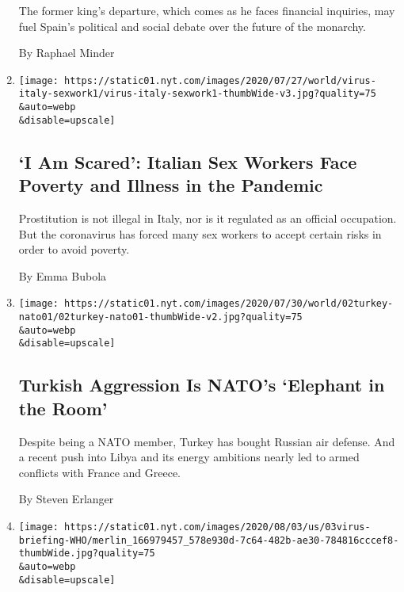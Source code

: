 \begin{enumerate}
  The former king's departure, which comes as he faces financial
  inquiries, may fuel Spain's political and social debate over the
  future of the monarchy.

  By Raphael Minder
\item
  \href{/2020/08/03/world/europe/italy-coronavirus-prostitution-sex-work.html}{}

  \texttt{[image: https://static01.nyt.com/images/2020/07/27/world/virus-italy-sexwork1/virus-italy-sexwork1-thumbWide-v3.jpg?quality=75\\\&auto=webp\\\&disable=upscale]}

  \hypertarget{i-am-scared-italian-sex-workers-face-poverty-and-illness-in-the-pandemic}{%
  \subsection{`I Am Scared': Italian Sex Workers Face Poverty and
  Illness in the
  Pandemic}\label{i-am-scared-italian-sex-workers-face-poverty-and-illness-in-the-pandemic}}

  Prostitution is not illegal in Italy, nor is it regulated as an
  official occupation. But the coronavirus has forced many sex workers
  to accept certain risks in order to avoid poverty.

  By Emma Bubola
\item
  \href{/2020/08/03/world/europe/turkey-nato.html}{}

  \texttt{[image: https://static01.nyt.com/images/2020/07/30/world/02turkey-nato01/02turkey-nato01-thumbWide-v2.jpg?quality=75\\\&auto=webp\\\&disable=upscale]}

  \hypertarget{turkish-aggression-is-natos-elephant-in-the-room}{%
  \subsection{Turkish Aggression Is NATO's `Elephant in the
  Room'}\label{turkish-aggression-is-natos-elephant-in-the-room}}

  Despite being a NATO member, Turkey has bought Russian air defense.
  And a recent push into Libya and its energy ambitions nearly led to
  armed conflicts with France and Greece.

  By Steven Erlanger
\item
  \href{/video/world/europe/100000007269932/who-coronavirus-briefing.html}{}

  \texttt{[image: https://static01.nyt.com/images/2020/08/03/us/03virus-briefing-WHO/merlin\_166979457\_578e930d-7c64-482b-ae30-784816cccef8-thumbWide.jpg?quality=75\\\&auto=webp\\\&disable=upscale]}


\end{enumerate}
